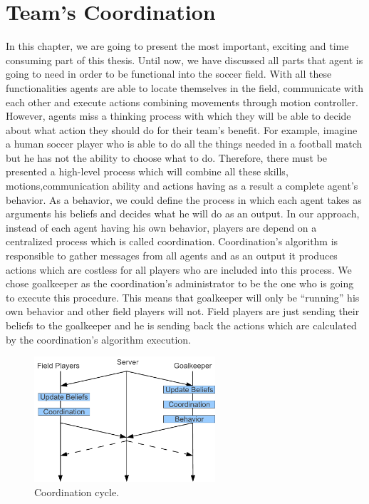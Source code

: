 \chapter{Team's Coordination}
\label{Coordination}

In this chapter, we are going to present the most important, exciting and time consuming part of this thesis. Until now, we have discussed all parts that agent is going to need in order to be functional into the soccer field.
With all these functionalities agents are able to locate themselves in the field, communicate with each other and execute actions combining movements through motion controller. However, agents miss a thinking process with which they will be able to decide about what action they should do for their team's benefit. For example, imagine a human soccer player who is able to do all the things needed in a football match but he has not the ability to choose what to do. Therefore, there must be presented a high-level process which will combine all these skills, motions,communication ability and actions having as a result a complete agent's behavior. As a behavior, we could define the process in which each agent takes as arguments his beliefs and decides what he will do as an output. In our approach, instead of each agent having his own behavior, players are depend on a centralized process which is called coordination.  Coordination's algorithm is responsible to gather messages from all agents and as an output it produces actions which are costless for all players who are included into this process. We chose goalkeeper as the coordination's administrator to be the one who is going to execute this procedure. This means that goalkeeper will only be ``running'' his own behavior and other field players will not. Field players are just sending their beliefs to the goalkeeper and he is sending back the actions which are calculated by the coordination's algorithm execution.


\begin{figure}[t!]
\centering
  \includegraphics[width=0.6\textwidth]{Chapter4/figures/CoordinationCycle.pdf}
  \caption{Coordination cycle.} 
  \label{fig:CoordinationCycle}
\end{figure}


